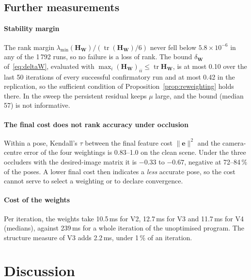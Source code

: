\documentclass[preprint,12pt]{elsarticle}
\theoremstyle{remark}
\newcommand{\W}{\mathbf{W}}
\newcommand{\HW}{\mathbf{H}_{\mathbf{W}}}
\newcommand{\e}{\mathbf{e}}
\newcommand{\tr}{\operatorname{tr}}
\begin{document}
\subsection{Further measurements}

\paragraph{Stability margin}
The rank margin $\lambda_{\min}(\HW)/(\tr(\HW)/6)$ never fell below
$5.8\times10^{-6}$ in any of the 1\,792 runs, so no failure is a loss of rank.
The bound $\delta_{\W}$ of~\eqref{eq:deltaW}, evaluated with
$\max_{i}(\HW)_{ii}\le\tr\HW$, is at most 0.10 over the last 50 iterations of
every successful confirmatory run and at most 0.42 in the replication, so the
sufficient condition of Proposition~\ref{prop:reweighting} holds there. In
the sweep the persistent residual keeps $\mu$ large, and the bound (median 57)
is not informative.

\paragraph{The final cost does not rank accuracy under occlusion}
Within a pose, Kendall's $\tau$ between the final feature cost
$\lVert\e\rVert^{2}$ and the camera-centre error of the four weightings is
0.83--1.0 on the clean scene. Under the three occluders with the
desired-image matrix it is $-0.33$ to $-0.67$, negative at 72--84\,\% of the
poses. A lower final cost then indicates a \emph{less} accurate pose, so the
cost cannot serve to select a weighting or to declare convergence.

\paragraph{Cost of the weights}
Per iteration, the weights take 10.5\,ms for V2, 12.7\,ms for V3 and 11.7\,ms
for V4 (medians), against 239\,ms for a whole iteration of the unoptimised
program. The structure measure of V3 adds 2.2\,ms, under 1\,\% of an
iteration.

\section{Discussion}
\label{sec:discussion}
\end{document}
